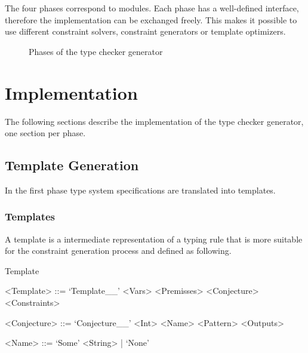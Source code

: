 The four phases correspond to modules. Each phase has a well-defined
interface, therefore the implementation can be exchanged freely. This
makes it possible to use different constraint solvers, constraint
generators or template optimizers.

\begin{figure}
\caption{Phases of the type checker generator}
\label{fig:phases}
\end{figure}
\section{Implementation}
\label{sec:implementation}
The following sections describe the implementation of the type checker
generator, one section per phase.

\subsection{Template Generation}
\label{sec:constraint-templates}
In the first phase type system specifications are translated into
templates.

\subsubsection{Templates}
A template is a intermediate representation of a typing rule that is
more suitable for the constraint generation process and defined as
following.

\begin{definition}{Template}
  \begin{grammar}
    <Template> ::= `Template__' <Vars> <Premisses> <Conjecture> <Constraints>

    <Conjecture> ::= `Conjecture__' <Int> <Name> <Pattern> <Outputs>

    <Name> ::= `Some' <String> | `None'
  \end{grammar}
\end{definition}


